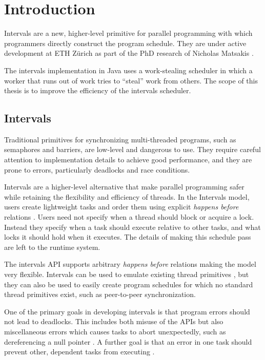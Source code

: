 
\chapter{Introduction}
\label{chap:introduction}

Intervals \cite{Matsakis2009b} are a new, higher-level primitive for
parallel programming with which programmers directly construct the
program schedule. They are under active development at ETH Zürich as
part of the PhD research of Nicholas Matsakis \cite{Matsakis2010}.

The intervals implementation in Java uses a work-stealing scheduler in
which a worker that runs out of work tries to ``steal'' work from
others. The scope of this thesis is to improve the efficiency of the
intervals scheduler.


\section{Intervals}
\label{sec:intro-intervals}

Traditional primitives for synchronizing multi-threaded programs, such
as semaphores and barriers, are low-level and dangerous to use. They
require careful attention to implementation details to achieve good
performance, and they are prone to errors, particularly deadlocks and
race conditions.

Intervals are a higher-level alternative that make parallel
programming safer while retaining the flexibility and efficiency of
threads. In the Intervals model, users create lightweight tasks and
order them using explicit \emph{happens before} relations
\cite{Lamport1978}. Users need not specify when a thread should block
or acquire a lock. Instead they specify when a task should execute
relative to other tasks, and what locks it should hold when it
executes. The details of making this schedule pass are left to the
runtime system.

The intervals API supports arbitrary \emph{happens before} relations
making the model very flexible. Intervals can be used to emulate
existing thread primitives \cite{Matsakis2009b}, but they can also be
used to easily create program schedules for which no standard thread
primitives exist, such as peer-to-peer synchronization.

One of the primary goals in developing intervals is that program
errors should not lead to deadlocks. This includes both misuse of the
APIs but also miscellaneous errors which causes tasks to abort
unexpectedly, such as dereferencing a null pointer
\cite{Matsakis2009}. A further goal is that an error in one task
should prevent other, dependent tasks from executing
\cite{Matsakis2010a}.

